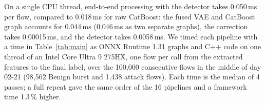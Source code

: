 On a single CPU thread, end-to-end processing with the detector takes 0.050\,ms per flow, compared to 0.018\,ms for raw CatBoost: the fused VAE and CatBoost graph accounts for 0.044\,ms (0.046\,ms as two separate graphs), the correction takes 0.00015\,ms, and the detector takes 0.0058\,ms. We timed each pipeline with a time in Table~\ref{tab:main} as ONNX Runtime 1.31 graphs and C++ code on one thread of an Intel Core Ultra 9 275HX, one flow per call from the extracted features to the final label, over the 100{,}000 consecutive flows in the middle of day 02-21 (98{,}562 Benign burst and 1{,}438 attack flows). Each time is the median of 4 passes; a full repeat gave the same order of the 16 pipelines and a framework time 1.3\,\% higher.
